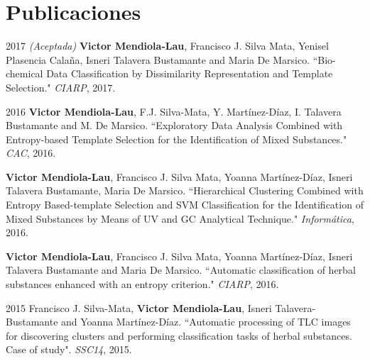 \documentclass[]{friggeri-cv}
\begin{document}
\pagebreak

\section{Publicaciones}
\begin{paperlist}
  \paperentry
    {2017}
    {}
    {}
    {
		\emph{(Aceptada)} \textbf{Victor Mendiola-Lau}, Francisco J. Silva Mata, Yenisel Plasencia Calaña, Isneri Talavera Bustamante and Maria De Marsico. ``Bio-chemical Data Classification by Dissimilarity Representation and Template Selection." \emph{CIARP}, 2017.
    }
\end{paperlist}

\vspace{0.5cm}

\begin{paperlist}
  \paperentry
    {2016}
    {}
    {}
    {
		\textbf{Victor Mendiola-Lau}, F.J. Silva-Mata, Y. Martínez-Díaz, I. Talavera Bustamante and M. De Marsico. ``Exploratory Data Analysis Combined with Entropy-based Template Selection for the Identification of Mixed Substances."	 \emph{CAC}, 2016.
    }
\end{paperlist}

\begin{paperlist}
  \paperentry
    {}
    {}
    {}
    {
		\textbf{Victor Mendiola-Lau}, Francisco J. Silva Mata, Yoanna Martínez-Díaz, Isneri Talavera Bustamante, Maria De Marsico. ``Hierarchical Clustering Combined with Entropy Based-template Selection and SVM Classification for the Identification of Mixed Substances by Means of UV and GC Analytical Technique." \emph{Informática}, 2016.
    }
\end{paperlist}

\begin{paperlist}
  \paperentry
    {}
    {}
    {}
    {
		\textbf{Victor Mendiola-Lau}, Francisco J. Silva Mata, Yoanna Martínez-Díaz, Isneri Talavera Bustamante and Maria De Marsico. ``Automatic classification of herbal substances enhanced with an entropy criterion." \emph{CIARP}, 2016.
    }
\end{paperlist}

\vspace{0.5cm}

\begin{paperlist}
  \paperentry
    {2015}
    {}
    {}
    {
		Francisco J. Silva-Mata, \textbf{Victor Mendiola-Lau}, Isneri Talavera-Bustamante and Yoanna Martínez-Díaz. ``Automatic processing of TLC images for discovering clusters and performing classification tasks of herbal substances. Case of study". \emph{SSC14}, 2015.
    }
\end{paperlist}
\end{document}
